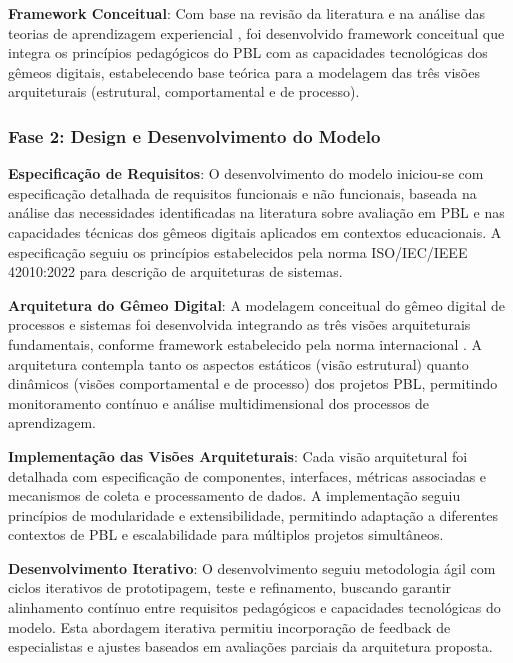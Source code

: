 \documentclass[12pt,a4paper]{article}
\begin{document}
\textbf{Framework Conceitual}: Com base na revisão da literatura e na análise das teorias de aprendizagem experiencial \cite{kolb1984}, foi desenvolvido framework conceitual que integra os princípios pedagógicos do PBL \cite{duch2001} com as capacidades tecnológicas dos gêmeos digitais, estabelecendo base teórica para a modelagem das três visões arquiteturais (estrutural, comportamental e de processo).

\subsubsection{Fase 2: Design e Desenvolvimento do Modelo}

\textbf{Especificação de Requisitos}: O desenvolvimento do modelo iniciou-se com especificação detalhada de requisitos funcionais e não funcionais, baseada na análise das necessidades identificadas na literatura sobre avaliação em PBL \cite{guo2020, lavado2024} e nas capacidades técnicas dos gêmeos digitais aplicados em contextos educacionais. A especificação seguiu os princípios estabelecidos pela norma ISO/IEC/IEEE 42010:2022 \cite{iso42010} para descrição de arquiteturas de sistemas.

\textbf{Arquitetura do Gêmeo Digital}: A modelagem conceitual do gêmeo digital de processos e sistemas foi desenvolvida integrando as três visões arquiteturais fundamentais, conforme framework estabelecido pela norma internacional \cite{iso42010}. A arquitetura contempla tanto os aspectos estáticos (visão estrutural) quanto dinâmicos (visões comportamental e de processo) dos projetos PBL, permitindo monitoramento contínuo e análise multidimensional dos processos de aprendizagem.

\textbf{Implementação das Visões Arquiteturais}: Cada visão arquitetural foi detalhada com especificação de componentes, interfaces, métricas associadas e mecanismos de coleta e processamento de dados. A implementação seguiu princípios de modularidade e extensibilidade, permitindo adaptação a diferentes contextos de PBL e escalabilidade para múltiplos projetos simultâneos.

\textbf{Desenvolvimento Iterativo}: O desenvolvimento seguiu metodologia ágil com ciclos iterativos de prototipagem, teste e refinamento, buscando garantir alinhamento contínuo entre requisitos pedagógicos e capacidades tecnológicas do modelo. Esta abordagem iterativa permitiu incorporação de feedback de especialistas e ajustes baseados em avaliações parciais da arquitetura proposta.
\end{document}
